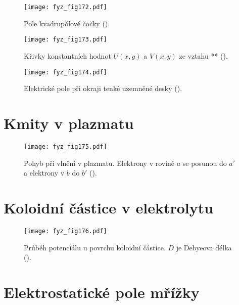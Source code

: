   \begin{figure}[ht!]  %
    \centering
    \texttt{[image: fyz\_fig172.pdf]}
    \caption{Pole kvadrupólové čočky (\cite[s.~127]{Feynman02}).}
    \label{fyz:fig172}
  \end{figure}

  \begin{figure}[ht!]  %
    \centering
    \texttt{[image: fyz\_fig173.pdf]}
    \caption{Křivky konstantních hodnot \(U(x, y)\) a \(V(x, y)\) ze vztahu **
             (\cite[s.~128]{Feynman02}).}
    \label{fyz:fig173}
  \end{figure}

  \begin{figure}[ht!]  %
    \centering
    \texttt{[image: fyz\_fig174.pdf]}
    \caption{Elektrické pole při okraji tenké uzemněné desky
             (\cite[s.~128]{Feynman02}).}
    \label{fyz:fig174}
  \end{figure}
  
\section{Kmity v plazmatu}\label{fyz:IIchapVsecXXIV}

  \begin{figure}[ht!]  %
    \centering
    \texttt{[image: fyz\_fig175.pdf]}
    \caption{Pohyb při vlnění v plazmatu. Elektrony v rovině \(a\) se posunou do \(a'\) a 
             elektrony v \(b\) do \(b'\)
             (\cite[s.~130]{Feynman02}).}
    \label{fyz:fig175}
  \end{figure}
  
\section{Koloidní částice v elektrolytu}\label{fyz:IIchapVsecXXV}

  \begin{figure}[ht!]  %
    \centering
    \texttt{[image: fyz\_fig176.pdf]}
    \caption{Průběh potenciálu u povrchu koloidní částice. \(D\) je Debyeova délka
             (\cite[s.~134]{Feynman02}).}
    \label{fyz:fig176}
  \end{figure}
  
\section{Elektrostatické pole mřížky}\label{fyz:IIchapVsecXXVI}

